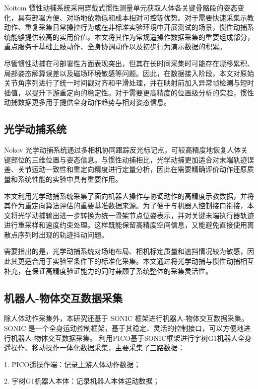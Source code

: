 Noitom 惯性动捕系统采用穿戴式惯性测量单元获取人体各关键骨骼段的姿态变化，具有部署方便、对场地依赖低和成本相对可控等优势。对于需要快速采集示教动作、重复采集日常操控行为或在非标准实验环境中开展测试的场景，惯性动捕系统能够提供较高的实用价值。本文将其作为常规遥操作数据采集的重要组成部分，重点服务于基础上肢动作、全身协调动作以及初步行为演示数据的积累。

尽管惯性动捕在可部署性方面表现突出，但其在长时间采集时可能存在漂移累积、局部姿态解算误差以及磁场环境敏感等问题。因此，在数据接入阶段，本文对原始关节角序列进行了统一时间戳对齐和平滑处理，并在映射前加入异常帧检测与短时插值，以提升下游重定向的稳定性。对于需要更高精度的位置级分析的实验，惯性动捕数据更多用于提供全身动作趋势与相对姿态信息。

\subsection{光学动捕系统}

Nokov 光学动捕系统通过多相机协同跟踪反光标记点，可较高精度地恢复人体关键部位的三维位置与姿态信息。与惯性动捕相比，光学动捕更加适合对末端轨迹误差、关节运动一致性和重定向精度进行定量分析，因此在需要精确评价动作还原质量和系统性能的实验中具有重要作用。

本文利用光学动捕系统采集了面向机器人操作与协调动作的高精度示教数据，并将其作为重定向算法评估的重要基准数据来源。为了便于与机器人控制接口衔接，本文将光学动捕输出进一步转换为统一骨架节点位姿表示，并对关键末端执行器轨迹进行重采样和速度约束处理。这样既能保留高精度空间信息，又能避免直接使用离散点序列时出现的轨迹抖动问题。

需要指出的是，光学动捕系统对场地布局、相机标定质量和遮挡情况较为敏感，因此其更适合用于实验室条件下的标准化采集。本文通过将光学动捕与惯性动捕相互补充，在保证高精度验证能力的同时兼顾了系统整体的采集灵活性。

\subsection{机器人-物体交互数据采集}

除人体动作采集外，本研究还基于 SONIC 框架进行机器人-物体交互数据采集。SONIC 是一个全身运动控制框架，基于其稳定、灵活的控制接口，可以方便地进行机器人-物体交互数据采集。
利用PICO基于SONIC框架进行宇树G1机器人全身遥操作、移动操作一体化数据采集，主要采集了三路数据：

1. PICO遥操作端：记录上游人体动作数据；

2. 宇树G1机器人本体：记录机器人本体运动数据；

